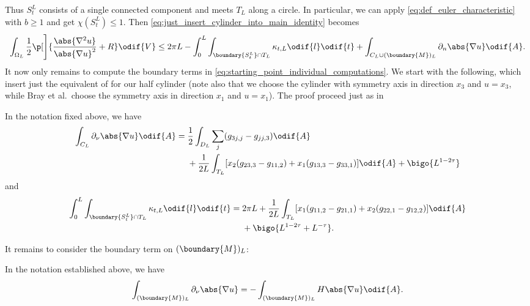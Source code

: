 \documentclass[titlepage,numbers=noenddot,headinclude,oneside,%
footinclude=true,cleardoublepage=empty,%
BCOR=5mm,paper=a4,fontsize=11pt,%
english,%
]{scrartcl}
\begin{document}
Thus \( S_t^L \) consists of a single connected component and meets \( T_L \) along a circle. In particular, we can apply \cref{eq:def_euler_characteristic} with \( b\geq 1 \) and get \( \chi(S_t^L)\leq 1 \). Then \cref{eq:just_insert_cylinder_into_main_identity} becomes
\begin{equation}
    \int_{\Omega_L} \frac{1}{2}\p[\Bigg]{\frac{\abs{\nabla^2 u}}{\abs{\nabla u}^2}+R }\odif{V} \leq2\pi L- \int_{0}^{L}\int _{\boundary{S_t^L} \cap T_L}\kappa_{t,L}\odif{l}\odif{t}+ \int_{C_L\cup (\boundary{M})_L}\partial_{n} \abs{\nabla u}\odif{A}.\label{eq:starting_point_individual_computations}
\end{equation}
It now only remains to compute the boundary terms in \cref{eq:starting_point_individual_computations}. We start with the following, which insert just the equivalent of \cite[Lemma 6.1 and Lemma 6.2]{brayHarmonicFunctionsMass2019} for our half cylinder (note also that we choose the cylinder with symmetry axis in direction \( x_3 \) and \( u=x_3 \), while Bray et al.~choose the symmetry axis in direction \( x_1 \) and \( u=x_1 \)). The proof proceed just as in \cite{brayHarmonicFunctionsMass2019}
\begin{lemma}\label{lem:cylinder_boundary_term}
    In the notation fixed above, we have
    \begin{equation*}
        \int_{C_L} \partial_\nu\abs{\nabla u}\odif{A}=\begin{aligned}[t]
            &\frac{1}{2}\int_{D_L}\sum_{j}(g_{3j,j}-g_{jj,3})\odif{A}\\
            &+\frac{1}{2L}\int_{T_L}[x_2(g_{23,3}-g_{11,2})+x_1  (g_{13,3}-g_{33,1})]\odif{A}+\bigo{L^{1-2\tau}}
        \end{aligned}
    \end{equation*}
    and
    \begin{equation*}
        \int_0^L\int_{\boundary{S_t^L} \cap T_L}\kappa_{t,L}\odif{l}\odif{t}=\begin{aligned}[t]
            &2\pi L +\frac{1}{2L}\int_{T_L}[x_1(g_{11,2}-g_{21,1})+x_2(g_{22,1}-g_{12,2})]\odif{A}\\
            &+\bigo{L^{1-2\tau}+L^{-\tau}}.
        \end{aligned}
    \end{equation*}
\end{lemma}
It remains to consider the boundary term on \( (\boundary{M})_L \):
\begin{lemma}\label{lem:half_space_boundary_boundary_term}
    In the notation established above, we have
    \begin{equation*}
        \int_{(\boundary{M})_L} \partial_\nu \abs{\nabla u}=-\int_{(\boundary{M})_L}H\abs{\nabla u}\odif{A}.
    \end{equation*}
\end{lemma}
\end{document}
